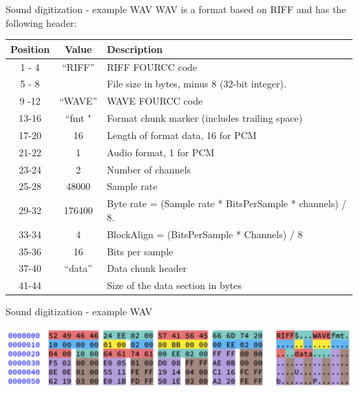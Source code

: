 \begin{frame}{Sound digitization - example WAV}
  WAV is a format based on RIFF and has the following header:
  \begin{center}
  \fontsize{8}{9}\selectfont
  \begin{tabularx}{13cm}{c|c|X}
    Position & Value & Description \\
    \hline
    1 - 4 & “RIFF” & RIFF FOURCC code \\
    5 - 8 &  & File size in bytes, minus 8 (32-bit integer). \\
    9 -12 & “WAVE” & WAVE FOURCC code \\
    13-16 & “fmt " & Format chunk marker (includes trailing space) \\
    17-20 & 16 & Length of format data, 16 for PCM \\
    21-22 & 1 & Audio format, 1 for PCM \\
    23-24 & 2 & Number of channels \\
    25-28 & 48000 & Sample rate \\
    29-32 & 176400 & Byte rate = (Sample rate * BitsPerSample * channels) / 8. \\
    33-34 & 4 & BlockAlign = (BitsPerSample * Channels) / 8 \\
    35-36 & 16 & Bits per sample \\
    37-40 & “data” & Data chunk header \\
    41-44 &  & Size of the data section in bytes \\
  \end{tabularx}
  \end{center}
\end{frame}

\begin{frame}{Sound digitization - example WAV}
  \begin{center}
  \includegraphics[width=\textwidth]{slides/audio-sound/RIFF_WAVE.png}
  \end{center}
\end{frame}


